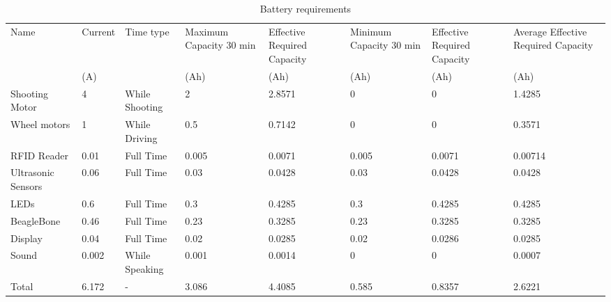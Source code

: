 \documentclass[11pt,twoside,a4paper]{report}
\begin{document}
\begin{appendices}
\begin{table}
\caption{Battery requirements}
\begin{center}
\begin{tabular}{m{2cm}|m{2cm}|m{2cm}|m{2cm}|m{2cm}|m{2cm}|m{2cm}|m{3.2cm}|}
Name               & Current & Time type      & Maximum Capacity 30 min & Effective Required Capacity & Minimum Capacity 30 min & Effective Required Capacity & Average Effective Required Capacity \\
                   & (A)     &                & (Ah)                    & (Ah)                        & (Ah)                    & (Ah)                        & (Ah)                                \\
Shooting Motor     & 4       & While Shooting & 2                       & 2.8571                & 0                       & 0                           & 1.4285                        \\
Wheel motors       & 1       & While Driving  & 0.5                     & 0.7142               & 0                       & 0                           & 0.3571                        \\
RFID Reader        & 0.01    & Full Time      & 0.005                   & 0.0071                & 0.005                   & 0.0071                & 0.00714 \\
Ultrasonic Sensors & 0.06    & Full Time      & 0.03                    & 0.0428              & 0.03                    & 0.0428                & 0.0428                        \\
LEDs               & 0.6     & Full Time      & 0.3                     & 0.4285                & 0.3                     & 0.4285                & 0.4285                       \\
BeagleBone         & 0.46    & Full Time      & 0.23                    & 0.3285               & 0.23                    & 0.3285               & 0.3285                        \\
Display            & 0.04    & Full Time      & 0.02                    & 0.0285                & 0.02                    & 0.0286               & 0.0285                        \\
Sound              & 0.002   & While Speaking & 0.001                   & 0.0014              & 0                       & 0                           & 0.0007                        \\
Total              & 6.172   &     -           & 3.086                   & 4.4085               & 0.585                   & 0.8357               & 2.6221                       
\end{tabular}
\end{center}
\label{table:battery}
\end{table}
\label{appendix:battery}

\end{appendices}
\end{document}
